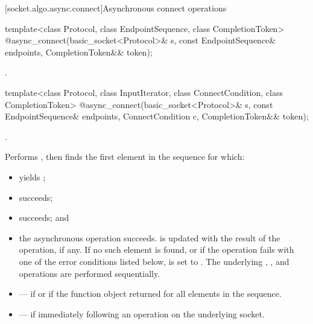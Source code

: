 [socket.algo.async.connect]{Asynchronous connect operations}

\begin{itemdecl}
template<class Protocol, class EndpointSequence, class CompletionToken>
  @\DEDUCED@ async_connect(basic_socket<Protocol>& s,
                        const EndpointSequence& endpoints,
                        CompletionToken&& token);
\end{itemdecl}

\begin{itemdescr}
\pnum
\returns {}.
\end{itemdescr}

\begin{itemdecl}
template<class Protocol, class InputIterator,
  class ConnectCondition, class CompletionToken>
    @\DEDUCED@ async_connect(basic_socket<Protocol>& s,
                          const EndpointSequence& endpoints,
                          ConnectCondition c,
                          CompletionToken&& token);
\end{itemdecl}

\begin{itemdescr}
\pnum
\completionsig {}.

\pnum
\effects Performs , then finds the first element  in the sequence  for which:
\begin{itemize}
\item
{} yields ;
\item
{} succeeds;
\item
{} succeeds; and
\item
 the asynchronous operation succeeds. is updated with the result of the  operation, if any. If no such element is found, or if the operation fails with one of the error conditions listed below,  is set to . \enternote The underlying , , and  operations are performed sequentially. \exitnote
\end{itemize}

\pnum
\errors
\begin{itemize}
\item
{} --- if  or if the function object  returned  for all elements in the sequence.
\item
{} --- if  immediately following an  operation on the underlying socket.
\end{itemize}
\end{itemdescr}

